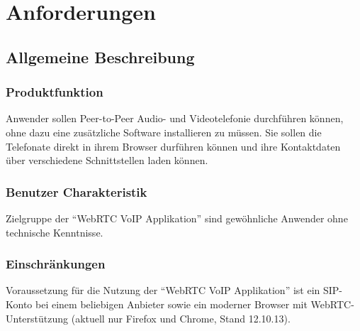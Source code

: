 \chapter{Anforderungen}
\section{Allgemeine Beschreibung}


\subsection{Produktfunktion}
Anwender sollen Peer-to-Peer Audio- und Videotelefonie durchführen können, ohne
dazu eine zusätzliche Software installieren zu müssen. Sie sollen die Telefonate
direkt in ihrem Browser durführen können und ihre Kontaktdaten über verschiedene
Schnittstellen laden können.

\subsection{Benutzer Charakteristik}
Zielgruppe der ``WebRTC VoIP Applikation'' sind gewöhnliche Anwender ohne technische Kenntnisse.

\subsection{Einschränkungen}
Voraussetzung für die Nutzung der ``WebRTC VoIP Applikation'' ist ein SIP-Konto
bei einem beliebigen Anbieter sowie ein moderner Browser mit
WebRTC-Unterstützung (aktuell nur Firefox und Chrome, Stand 12.10.13).


